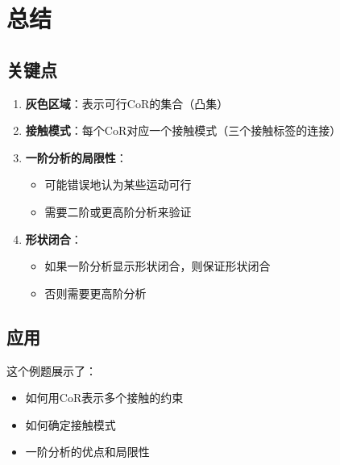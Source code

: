 \documentclass[12pt,a4paper]{article}
\begin{document}
\section{总结}

\subsection{关键点}

\begin{enumerate}
\item \textbf{灰色区域}：表示可行CoR的集合（凸集）

\item \textbf{接触模式}：每个CoR对应一个接触模式（三个接触标签的连接）

\item \textbf{一阶分析的局限性}：
   \begin{itemize}
   \item 可能错误地认为某些运动可行
   \item 需要二阶或更高阶分析来验证
   \end{itemize}

\item \textbf{形状闭合}：
   \begin{itemize}
   \item 如果一阶分析显示形状闭合，则保证形状闭合
   \item 否则需要更高阶分析
   \end{itemize}
\end{enumerate}

\subsection{应用}

这个例题展示了：
\begin{itemize}
\item 如何用CoR表示多个接触的约束
\item 如何确定接触模式
\item 一阶分析的优点和局限性
\end{itemize}
\end{document}
